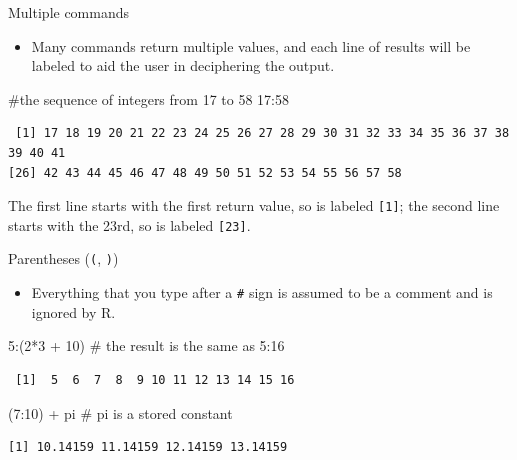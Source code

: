 \documentclass[
  9pt,
  a4paper,
  ignorenonframetext,
  notheorems]{beamer}
\newenvironment{Shaded}{\begin{snugshade}}{\end{snugshade}}
\newcommand{\CommentTok}[1]{\textcolor[rgb]{0.37,0.37,0.37}{#1}}
\newcommand{\DecValTok}[1]{\textcolor[rgb]{0.68,0.00,0.00}{#1}}
\newcommand{\NormalTok}[1]{\textcolor[rgb]{0.00,0.23,0.31}{#1}}
\newcommand{\SpecialCharTok}[1]{\textcolor[rgb]{0.37,0.37,0.37}{#1}}
\providecommand{\tightlist}{%
  \setlength{\itemsep}{0pt}\setlength{\parskip}{0pt}}\usepackage{longtable,booktabs,array}
\begin{document}
\begin{frame}[fragile]
\begin{block}{Multiple commands}
\protect\hypertarget{multiple-commands}{}
\begin{itemize}
\tightlist
\item
  Many commands return multiple values, and each line of results will be
  labeled to aid the user in deciphering the output.
\end{itemize}

\begin{Shaded}
\begin{Highlighting}[]
\CommentTok{\#the sequence of integers from 17 to 58}
\DecValTok{17}\SpecialCharTok{:}\DecValTok{58}
\end{Highlighting}
\end{Shaded}

\begin{verbatim}
 [1] 17 18 19 20 21 22 23 24 25 26 27 28 29 30 31 32 33 34 35 36 37 38 39 40 41
[26] 42 43 44 45 46 47 48 49 50 51 52 53 54 55 56 57 58
\end{verbatim}

The first line starts with the first return value, so is labeled
\texttt{{[}1{]}}; the second line starts with the 23rd, so is labeled
\texttt{{[}23{]}}.
\end{block}

\begin{block}{Parentheses (\texttt{(}, \texttt{)})}
\protect\hypertarget{parentheses}{}
\begin{itemize}
\tightlist
\item
  Everything that you type after a \texttt{\#} sign is assumed to be a
  comment and is ignored by R.
\end{itemize}

\begin{Shaded}
\begin{Highlighting}[]
\DecValTok{5}\SpecialCharTok{:}\NormalTok{(}\DecValTok{2}\SpecialCharTok{*}\DecValTok{3} \SpecialCharTok{+} \DecValTok{10}\NormalTok{) }\CommentTok{\# the result is the same as 5:16}
\end{Highlighting}
\end{Shaded}

\begin{verbatim}
 [1]  5  6  7  8  9 10 11 12 13 14 15 16
\end{verbatim}

\begin{Shaded}
\begin{Highlighting}[]
\NormalTok{(}\DecValTok{7}\SpecialCharTok{:}\DecValTok{10}\NormalTok{) }\SpecialCharTok{+}\NormalTok{ pi }\CommentTok{\# pi is a stored constant}
\end{Highlighting}
\end{Shaded}

\begin{verbatim}
[1] 10.14159 11.14159 12.14159 13.14159
\end{verbatim}
\end{block}
\end{frame}
\end{document}
